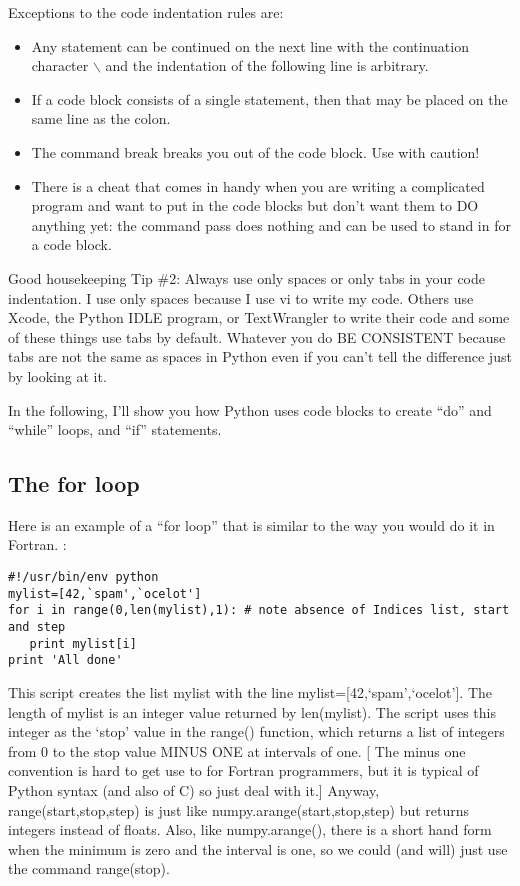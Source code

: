 {\noindent Exceptions to the code indentation rules are:
\begin{itemize}
\item  Any statement can be continued on the next line with the continuation character $\backslash$ and the indentation of the following line is arbitrary.  \item If a code block consists of a single statement, then that may be placed on the same line as the colon. 
\item The command {\color{blue}break} breaks you out of the code block. Use with caution!
\item There is a cheat that comes in handy when you are writing a complicated program and want to put in the code blocks but don't want them to DO anything yet:  the command  {\color{blue} pass} does nothing and can be used to stand in for a code block.
\end{itemize}

{\singlespacing \color{magenta}Good housekeeping Tip \#2: Always use only spaces or only tabs in your code indentation.  I use only spaces because I use {\color{blue}vi} to write my code.  Others use Xcode, the  Python IDLE program, or TextWrangler to write their code and some of these things use tabs by default.  Whatever you do BE CONSISTENT because tabs are not the same as spaces in Python even if you can't tell the difference just by looking at it.}




In the following, I'll show you how Python uses code blocks  to create ``do'' and ``while'' loops, and ``if'' statements.

\subsection{The for loop}

Here is an example of a ``for loop'' that is similar to the way you would do it in Fortran. :   


{\singlespacing \color{blue} \begin{verbatim}
#!/usr/bin/env python
mylist=[42,`spam',`ocelot']
for i in range(0,len(mylist),1): # note absence of Indices list, start and step
   print mylist[i]
print 'All done' 
\end{verbatim}}

This script creates the list mylist with the line {\color{blue}mylist=[42,`spam',`ocelot']}.  The length of mylist is an integer value returned by {\color{blue}len(mylist)}.      The script uses this integer as the `stop' value in the  {\color{blue}range()} function,  which returns a list of integers from 0 to the stop value  MINUS ONE at intervals of one.   [ The minus one convention is hard to get use to  for Fortran programmers, but it is typical of Python syntax (and also of C) so just deal with it.]  Anyway, {\color{blue}range(start,stop,step)} is just like {\color{blue}numpy.arange(start,stop,step)} but returns integers instead of floats.  Also, like {\color{blue}numpy.arange()}, there is a short hand form when the minimum is zero and the interval is one, so we could (and will)  just use the command {\color{blue}range(stop)}. 
  
}

